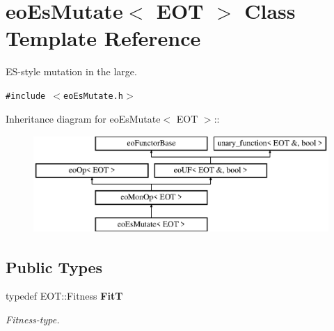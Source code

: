 \section{eo\-Es\-Mutate$<$ EOT $>$ Class Template Reference}
\label{classeo_es_mutate}
ES-style mutation in the large.  


{\tt \#include $<$eo\-Es\-Mutate.h$>$}

Inheritance diagram for eo\-Es\-Mutate$<$ EOT $>$::\begin{figure}[H]
\begin{center}
\leavevmode
\includegraphics[height=3.71476cm]{classeo_es_mutate}
\end{center}
\end{figure}
\subsection*{Public Types}
\begin{CompactItemize}
\item 
typedef EOT::Fitness {\bf Fit\-T}\label{classeo_es_mutate_w0}

\begin{CompactList}\small\item\em Fitness-type. \item\end{CompactList}\end{CompactItemize}
